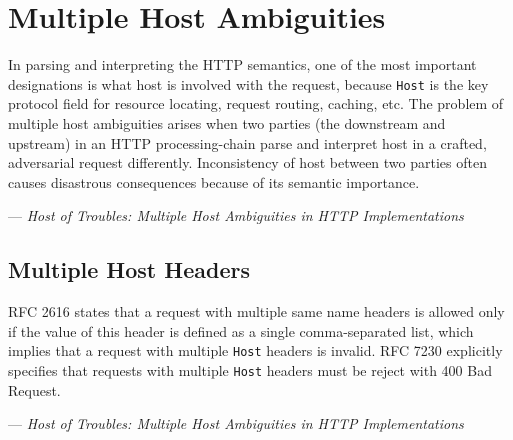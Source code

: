  \section{Multiple Host Ambiguities}
In parsing and interpreting the HTTP semantics,  one of the most important designations is what host is involved with the request, because \texttt{Host} is the key protocol field for resource locating, request routing, caching, etc. The problem of multiple host ambiguities arises when two parties (the downstream and upstream) in an HTTP processing-chain parse and interpret host in a crafted, adversarial request  differently. Inconsistency of host between two parties often causes disastrous consequences because of its semantic importance. 

\hspace{1 cm}--- \textit{Host of Troubles: Multiple Host Ambiguities in HTTP Implementations}

\subsection{Multiple Host Headers}
\label{sec:Multiple_Host_Headers}
RFC 2616\cite{rfc2616} states that a request with multiple same name headers is allowed only if the value of this header is defined as a single comma-separated list, which implies that a request with multiple \texttt{Host} headers is invalid.
RFC 7230 \cite{rfc7230} explicitly specifies that requests with multiple
\texttt{Host} headers must be reject with 400 Bad Request.

\hspace{1 cm}--- \textit{Host of Troubles: Multiple Host Ambiguities in HTTP Implementations}

